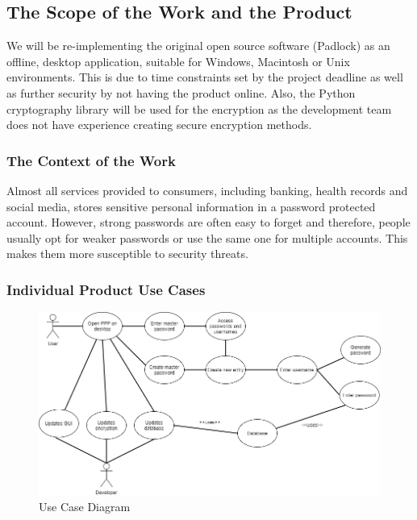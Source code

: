 \documentclass[12pt, titlepage]{article}
\begin{document}
\subsection{The Scope of the Work and the Product}

We will be re-implementing the original open source software (Padlock) as an offline, 
desktop application, suitable for Windows, Macintosh or Unix environments. This is due to time 
constraints set by the project deadline as well as further security by not having the product online. 
Also, the Python cryptography library will be used for the encryption as the development team does not 
have experience creating secure encryption methods. 

\subsubsection{The Context of the Work}

Almost all services provided to consumers, including banking, health records and social media, 
stores sensitive personal information in a password protected account. However, strong passwords are 
often easy to forget and therefore, people usually opt for weaker passwords or use the same 
one for multiple accounts. This makes them more susceptible to security threats.

\subsubsection{Individual Product Use Cases}

\begin{figure}[H]
\includegraphics[scale=0.5]{Images/UseCase.png}
\caption{Use Case Diagram}
\end{figure}
\end{document}
